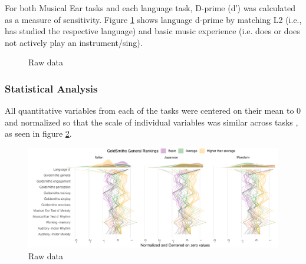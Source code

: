 \documentclass[a4paper]{article}
\begin{document}
For both Musical Ear tasks and each language task,  D-prime (d′) was calculated as a measure of sensitivity\cite{Macmillan_Creelman_2004}. Figure \ref{fig:dprime} shows language d-prime by matching L2 (i.e., has studied the respective language) and basic music experience (i.e. does or does not actively play an instrument/sing). 

\begin{figure}[t]
  \centering
  \caption{Raw data}
  \label{fig:dprime}
\end{figure}

\subsubsection{Statistical Analysis}


All quantitative variables from each of the tasks were centered on their mean to 0 and normalized so that the scale of individual variables was similar across tasks , as seen in figure \ref{fig:centered_data}.

\begin{figure}[t]
  \centering
  \includegraphics[width=.9\textwidth]{SP_24_visuals/by_gs.pdf}
  \caption{Raw data}
  \label{fig:centered_data}
\end{figure}
\end{document}

